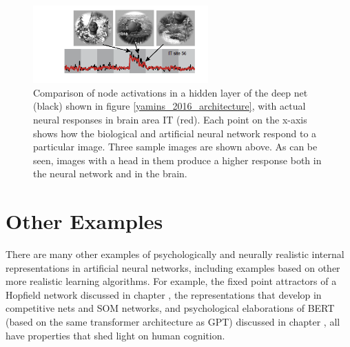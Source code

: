 \begin{figure}[h]
\centering
\includegraphics[width=0.6\textwidth]{images/deepNetYaminsITResponses_2016.png}
\caption[Yamins.]{Comparison of node activations in a hidden layer of the deep net (black) shown in figure \ref{yamins_2016_architecture}, with actual neural responses in brain area IT (red). Each point on the x-axis shows how the biological and artificial neural network respond to a particular image. Three sample images are shown above. As can be seen, images with a head in them produce a higher response both in the neural network and in the brain.}
\label{yamins_2016_responses}
\end{figure}


\section{Other Examples}

There are many other examples of psychologically and neurally realistic internal representations  in artificial neural networks, including examples based on other more realistic learning algorithms. For example, the fixed point attractors of a Hopfield network discussed in chapter , the representations that develop in competitive nets and SOM networks, and psychological elaborations of BERT  (based on the same transformer architecture as GPT) discussed in chapter , all have properties that shed light on human cognition. 


